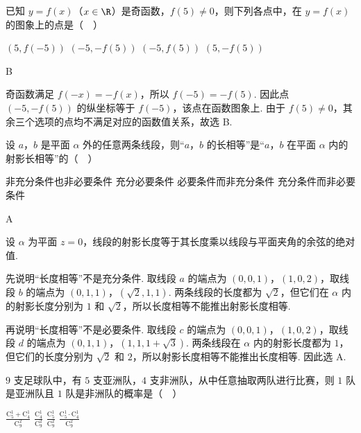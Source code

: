 \begin{problem}
已知 \(y = f(x)\)（\(x \in \R\)）是奇函数，\(f(5) \neq 0\)，则下列各点中，在 \(y = f(x)\) 的图象上的点是（\(\quad\)）

\choices
    {\((5, f(-5))\)}
    {\((-5, -f(5))\)}
    {\((-5, f(5))\)}
    {\((5, -f(5))\)}
\end{problem}

\begin{answer}
B
\end{answer}

\begin{solution}
奇函数满足 \(f(-x)=-f(x)\)，所以 \(f(-5)=-f(5)\). 因此点 \((-5,-f(5))\) 的纵坐标等于 \(f(-5)\)，该点在函数图象上. 由于 \(f(5)\ne0\)，其余三个选项的点均不满足对应的函数值关系，故选 B.
\end{solution}

\begin{problem}
设 \(a\)，\(b\) 是平面 \(\alpha\) 外的任意两条线段，则“\(a\)，\(b\) 的长相等”是“\(a\)，\(b\) 在平面 \(\alpha\) 内的射影长相等”的（\(\quad\)）

\choices
    {非充分条件也非必要条件}
    {充分必要条件}
    {必要条件而非充分条件}
    {充分条件而非必要条件}
\end{problem}

\begin{answer}
A
\end{answer}

\begin{solution}
设 \(\alpha\) 为平面 \(z=0\)，线段的射影长度等于其长度乘以线段与平面夹角的余弦的绝对值.

先说明“长度相等”不是充分条件. 取线段 \(a\) 的端点为 \((0,0,1)\)，\((1,0,2)\)，取线段 \(b\) 的端点为 \((0,1,1)\)，\((\sqrt{2},1,1)\). 两条线段的长度都为 \(\sqrt{2}\)，但它们在 \(\alpha\) 内的射影长度分别为 \(1\) 和 \(\sqrt{2}\)，所以长度相等不能推出射影长度相等.

再说明“长度相等”不是必要条件. 取线段 \(c\) 的端点为 \((0,0,1)\)，\((1,0,2)\)，取线段 \(d\) 的端点为 \((0,1,1)\)，\((1,1,1+\sqrt{3})\). 两条线段在 \(\alpha\) 内的射影长度都为 \(1\)，但它们的长度分别为 \(\sqrt{2}\) 和 \(2\)，所以射影长度相等不能推出长度相等. 因此选 A.
\end{solution}

\begin{problem}
\(9\) 支足球队中，有 \(5\) 支亚洲队，\(4\) 支非洲队，从中任意抽取两队进行比赛，则 \(1\) 队是亚洲队且 \(1\) 队是非洲队的概率是（\(\quad\)）

\choices
    {\(\frac{\mathrm C_5^1 + \mathrm C_4^1}{\mathrm C_9^2}\)}
    {\(\frac{\mathrm C_4^1}{\mathrm C_9^2}\)}
    {\(\frac{\mathrm C_5^1}{\mathrm C_9^2}\)}
    {\(\frac{\mathrm C_5^1 \cdot \mathrm C_4^1}{\mathrm C_9^2}\)}
\end{problem}

